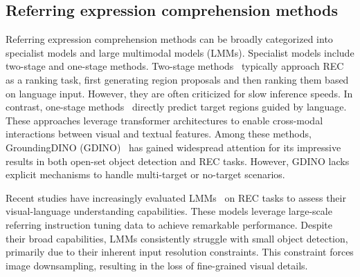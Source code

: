 \subsection{Referring expression comprehension methods}
Referring expression comprehension methods can be broadly categorized into specialist models and large multimodal models (LMMs). Specialist models include two-stage and one-stage methods. Two-stage methods~\cite{hu2017modeling, liu2019learning, hong2019learning, reclip, han2024zero} typically approach REC as a ranking task, first generating region proposals and then ranking them based on language input. However, they are often criticized for slow inference speeds. In contrast, one-stage methods~\cite{mdetr, glip, liu2023dq, gan2020large, yan2023universal, gdino} directly predict target regions guided by language. These approaches leverage transformer architectures to enable cross-modal interactions between visual and textual features. Among these methods, GroundingDINO (GDINO)~\cite{gdino} has gained widespread attention for its impressive results in both open-set object detection and REC tasks. However, GDINO lacks explicit mechanisms to handle multi-target or no-target scenarios.\par


Recent studies have increasingly evaluated LMMs~\cite{llava, you2023ferret, chen2023minigpt, chen2023shikra, bai2023qwen, peng2023kosmos, one_peace, lin2023sphinx, zhan2025griffon, wang2023cogvlm} on REC tasks to assess their visual-language understanding capabilities. These models leverage large-scale referring instruction tuning data to achieve remarkable performance. Despite their broad capabilities, LMMs consistently struggle with small object detection, primarily due to their inherent input resolution constraints. This constraint forces image downsampling, resulting in the loss of fine-grained visual details.



